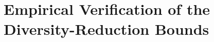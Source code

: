 %
%
%
%
%
%


\section{Empirical Verification of the Diversity-Reduction Bounds}
\label{sec:empirical-verification}


